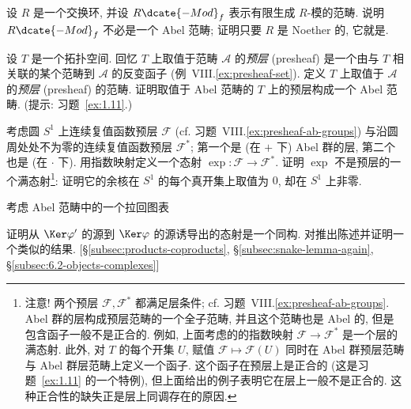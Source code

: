 \begin{prob}\label{ex:1.13}
设 $R$ 是一个交换环, 并设 $R\dcate{-Mod}_f$ 表示有限生成 $R$-模的范畴. 说明 $R\dcate{-Mod}_f$ 不必是一个 Abel 范畴; 证明只要 $R$ 是 Noether 的, 它就是.
\end{prob}

\begin{prob}\label{ex:1.14}
设 $T$ 是一个拓扑空间. 回忆 $T$ 上取值于范畴 $\mathcal{A}$ 的\emph{预层} (presheaf) 是一个由与 $T$ 相关联的某个范畴到 $\mathcal{A}$ 的反变函子 (例~VIII.\ref{ex:presheaf-set}). 定义 $T$ 上取值于 $\mathcal{A}$ 的\emph{预层} (presheaf) 的范畴. 证明取值于 Abel 范畴的 $T$ 上的预层构成一个 Abel 范畴. (提示: 习题~\ref{ex:1.11}.)
\end{prob}

\begin{prob}\label{ex:1.15}
考虑圆 $S^1$ 上连续复值函数预层 $\mathcal{F}$ (cf. 习题~VIII.\ref{ex:presheaf-ab-groups}) 与沿圆周处处不为零的连续复值函数预层 $\mathcal{F}^*$; 第一个是 (在 $+$ 下) Abel 群的层, 第二个也是 (在 $\cdot$ 下). 用指数映射定义一个态射 $\exp:\mathcal{F}\to\mathcal{F}^*$.
证明 $\exp$ 不是预层的一个满态射\footnote{注意! 两个预层 $\mathcal{F},\mathcal{F}^*$ 都满足层条件; cf. 习题~VIII.\ref{ex:presheaf-ab-groups}. Abel 群的层构成预层范畴的一个全子范畴, 并且这个范畴也是 Abel 的, 但是包含函子一般不是正合的. 例如, 上面考虑的的指数映射 $\mathcal{F}\to\mathcal{F}^*$ 是一个层的满态射. 此外, 对 $T$ 的每个开集 $U$, 赋值 $\mathcal{F}\mapsto\mathcal{F}(U)$ 同时在 Abel 群预层范畴与 Abel 群层范畴上定义一个函子. 这个函子在预层上是正合的 (这是习题~\ref{ex:1.11} 的一个特例), 但上面给出的例子表明它在层上一般不是正合的. 这种正合性的缺失正是层上同调存在的原因.}: 证明它的余核在 $S^1$ 的每个真开集上取值为 $0$, 却在 $S^1$ 上非零.
\end{prob}

\begin{prob}\label{ex:1.16}
考虑 Abel 范畴中的一个拉回图表
\begin{center}
\end{center}
证明从 $\Ker\varphi'$ 的源到 $\Ker\varphi$ 的源诱导出的态射是一个同构.
对推出陈述并证明一个类似的结果. [\S\ref{subsec:products-coproducts}, \S\ref{subsec:snake-lemma-again}, \S\ref{subsec:6.2-objects-complexes}]
\end{prob}

